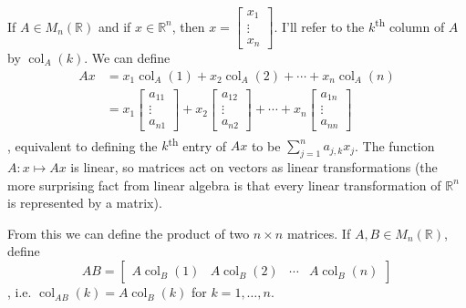 \documentclass[12pt,letterpaper,DIV=11,final]{scrartcl}
\theoremstyle{plain}
\theoremstyle{definition}
\theoremstyle{remark}
\DeclareMathOperator{\col}{col}
\begin{document}
If $A \in M_n(\mathbb{R})$ and if $x \in \mathbb{R}^n$, then $x = \begin{bmatrix} x_1 \\ \vdots \\ x_n \end{bmatrix}$.
I'll refer to the $k$\textsuperscript{th} column of $A$ by $\col_A(k)$.
We can define
\begin{align*}
  Ax &= x_1 \col_A(1) + x_2 \col_A(2) + \cdots + x_n \col_A(n) \\
     &= x_1
     \begin{bmatrix}
       a_{1 1} \\ \vdots \\ a_{n 1}
     \end{bmatrix} + x_2
     \begin{bmatrix}
       a_{1 2} \\ \vdots \\ a_{n 2}
     \end{bmatrix} + \cdots + x_n
     \begin{bmatrix}
       a_{1 n} \\ \vdots \\ a_{n n}
     \end{bmatrix}
\end{align*}
, equivalent to defining the $k$\textsuperscript{th} entry of $Ax$ to be $\sum^n_{j = 1} a_{j,k} x_j$.
The function $A : x \mapsto Ax$ is linear, so matrices act on vectors as linear transformations
(the more surprising fact from linear algebra is that every linear transformation of $\mathbb{R}^n$ is represented by a matrix).

From this we can define the product of two $n \times n$ matrices.
If $A, B \in M_n(\mathbb{R})$, define
\begin{displaymath}
  AB = \begin{bmatrix} A \col_B(1) & A \col_B(2) & \cdots & A \col_B(n) \end{bmatrix}
\end{displaymath}
, i.e. $\col_{AB}(k) = A \col_B(k)$ for $k = 1, \dots, n$.
\end{document}

